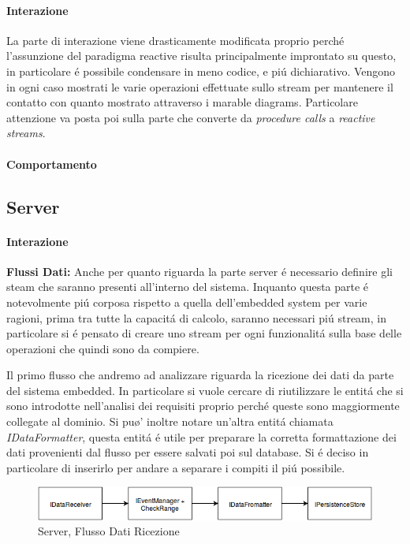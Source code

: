 \paragraph{Interazione} La parte di interazione viene drasticamente modificata proprio perch\'e l'assunzione del paradigma reactive risulta principalmente improntato su questo, in particolare \'e possibile condensare in meno codice, e pi\'u dichiarativo. Vengono in ogni caso mostrati le varie operazioni effettuate sullo stream per mantenere il contatto con quanto mostrato attraverso i marable diagrams. Particolare attenzione va posta poi sulla parte che converte da \textit{procedure calls} a \textit{reactive streams}.

\paragraph{Comportamento}

\subsection{Server}

\paragraph{Interazione}

\textbf{Flussi Dati:} Anche per quanto riguarda la parte server \'e necessario definire gli steam che saranno presenti all'interno del sistema. Inquanto questa parte \'e notevolmente pi\'u corposa rispetto a quella dell'embedded system per varie ragioni, prima tra tutte la capacit\'a di calcolo, saranno necessari pi\'u stream, in particolare si \'e pensato di creare uno stream per ogni funzionalit\'a sulla base delle operazioni che quindi sono da compiere.

Il primo flusso che andremo ad analizzare riguarda la ricezione dei dati da parte del sistema embedded. In particolare si vuole cercare di riutilizzare le entit\'a che si sono introdotte nell'analisi dei requisiti proprio perch\'e queste sono maggiormente collegate al dominio. Si pu\o' inoltre notare un'altra entit\'a chiamata \textit{IDataFormatter}, questa entit\'a \'e utile per preparare la corretta formattazione dei dati provenienti dal flusso per essere salvati poi sul database. Si \'e deciso in particolare di inserirlo per andare a separare i compiti il pi\'u possibile.

\begin{figure}[h]
\centering
\includegraphics[width=\textwidth]{Figures/LogicArchitecture/Server/FlowDiagramReceiveData}
\caption{Server, Flusso Dati Ricezione}
\end{figure}

